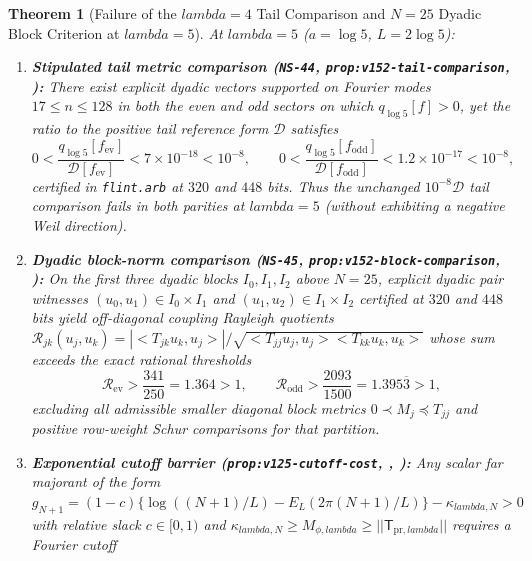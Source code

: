 \documentclass[11pt]{article}
\def\lambda{lambda}%
\def\norm#1{||#1||}%
\def\ip#1#2{<#1,#2>}%
\newtheorem{theorem}{Theorem}[section]
\theoremstyle{remark}
\newcommand{\norm}[1]{\left\lVert #1\right\rVert}
\newcommand{\ip}[2]{\left\langle #1,#2\right\rangle}
\begin{document}
\begin{theorem}[Failure of the $\lambda = 4$ Tail Comparison and $N = 25$ Dyadic Block Criterion at $\lambda = 5$]
\label{thm:lambda5-failures}
At $\lambda = 5$ ($a = \log 5$, $L = 2\log 5$):
\begin{enumerate}[label=(\alph*)]
  \item \textbf{Stipulated tail metric comparison (\texttt{NS-44}, \texttt{prop:v152-tail-comparison}, ):} There exist explicit dyadic vectors supported on Fourier modes $17 \le n \le 128$ in both the even and odd sectors on which $q_{\log 5}[f] > 0$, yet the ratio to the positive tail reference form $\mathcal{D}$ satisfies
  \begin{equation}
    0 < \frac{q_{\log 5}[f_{\mathrm{ev}}]}{\mathcal{D}[f_{\mathrm{ev}}]} < 7 \times 10^{-18} < 10^{-8}, \qquad
    0 < \frac{q_{\log 5}[f_{\mathrm{odd}}]}{\mathcal{D}[f_{\mathrm{odd}}]} < 1.2 \times 10^{-17} < 10^{-8},
  \end{equation}
  certified in \texttt{flint.arb} at $320$ and $448$ bits. Thus the unchanged $10^{-8}\mathcal{D}$ tail comparison fails in both parities at $\lambda = 5$ (without exhibiting a negative Weil direction).
  \item \textbf{Dyadic block-norm comparison (\texttt{NS-45}, \texttt{prop:v152-block-comparison}, ):} On the first three dyadic blocks $I_0, I_1, I_2$ above $N = 25$, explicit dyadic pair witnesses $(u_0, u_1) \in I_0 \times I_1$ and $(u_1, u_2) \in I_1 \times I_2$ certified at $320$ and $448$ bits yield off-diagonal coupling Rayleigh quotients $\mathcal{R}_{jk}(u_j,u_k) = |\ip{T_{jk}u_k}{u_j}| / \sqrt{\ip{T_{jj}u_j}{u_j}\ip{T_{kk}u_k}{u_k}}$ whose sum exceeds the exact rational thresholds
  \begin{equation}
    \mathcal{R}_{\mathrm{ev}} > \frac{341}{250} = 1.364 > 1, \qquad
    \mathcal{R}_{\mathrm{odd}} > \frac{2093}{1500} = 1.395\overline{3} > 1,
  \end{equation}
  excluding all admissible smaller diagonal block metrics $0 \prec M_j \preceq T_{jj}$ and positive row-weight Schur comparisons for that partition.
  \item \textbf{Exponential cutoff barrier (\texttt{prop:v125-\allowbreak cutoff-\allowbreak cost}, , ):} Any scalar far majorant of the form $g_{N+1} = (1-c)\{\log((N+1)/L) - E_L(2\pi(N+1)/L)\} - \kappa_{\lambda,N} > 0$ with relative slack $c \in [0,1)$ and $\kappa_{\lambda,N} \ge M_{\phi,\lambda} \ge \norm{\mathsf{T}_{\mathrm{pr},\lambda}}$ requires a Fourier cutoff

\end{enumerate}
\end{theorem}
\end{document}
